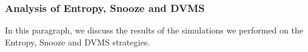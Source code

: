 \subsubsection{Analysis of Entropy, Snooze and DVMS}
\label{subsec:first-usecase}
In this paragraph, we discuss the results of the simulations we
performed on the Entropy,  Snooze and DVMS strategies.

